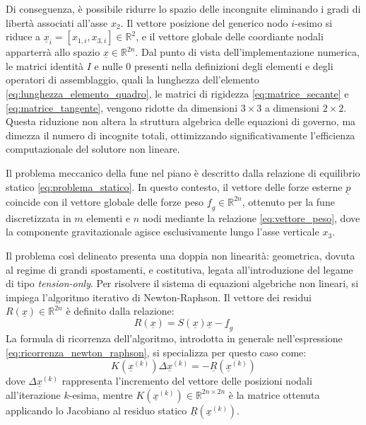 Di conseguenza, è possibile ridurre lo spazio delle incongnite eliminando i gradi di libertà associati all'asse $x_2$. Il vettore posizione del generico nodo $i$-esimo si riduce a $\underline{x}_i = [x_{1,i}, x_{3,i}] \in \mathbb{R}^{2}$, e il vettore globale delle coordiante nodali apparterrà allo spazio $\underline{x} \in \mathbb{R}^{2n}$.
Dal punto di vista dell'implementazione numerica, le matrici identità $I$ e nulle $0$ presenti nella definizioni degli elementi e degli operatori di assemblaggio, quali la lunghezza dell'elemento \eqref{eq:lunghezza_elemento_quadro}, le matrici di rigidezza \eqref{eq:matrice_secante} e \eqref{eq:matrice_tangente}, vengono ridotte da dimensioni $3 \times 3$ a dimensioni $2 \times 2$. Questa riduzione non altera la struttura algebrica delle equazioni di governo, ma dimezza il numero di incognite totali, ottimizzando significativamente l'efficienza computazionale del solutore non lineare.

\vspace{1em}
Il problema meccanico della fune nel piano è descritto dalla relazione di equilibrio statico \eqref{eq:problema_statico}. In questo contesto, il vettore delle forze esterne $\underline{p}$ coincide con il vettore globale delle forze peso $\underline{f}_{g} \in \mathbb{R}^{2n}$, ottenuto per la fune discretizzata in $m$ elementi e $n$ nodi mediante la relazione \eqref{eq:vettore_peso}, dove la componente gravitazionale agisce esclusivamente lungo l'asse verticale $x_3$.

Il problema così delineato presenta una doppia non linearità: geometrica, dovuta al regime di grandi spostamenti, e costitutiva, legata all'introduzione del legame di tipo \textit{tension-only}. Per risolvere il sistema di equazioni algebriche non lineari, si impiega l'algoritmo iterativo di Newton-Raphson. Il vettore dei residui $R(\underline{x}) \in \mathbb{R}^{2n}$ è definito dalla relazione: 
\begin{equation}
   R(\underline{x}) = S(\underline{x})\underline{x} - \underline{f}_{g}
   \label{eq:residuo_problema_statico}
\end{equation}
La formula di ricorrenza dell'algoritmo, introdotta in generale nell'espressione \eqref{eq:ricorrenza_newton_raphson}, si specializza per questo caso come:
\begin{equation}
   K(\underline{x}^{(k)}) \Delta\underline{x}^{(k)} = - \underline{R}(\underline{x}^{(k)})
\end{equation}
dove $\Delta \underline{x}^{(k)}$ rappresenta l'incremento del vettore delle posizioni nodali all'iterazione $k$-esima, mentre $K(\underline{x}^{(k)}) \in \mathbb{R}^{2n \times 2n}$ è la matrice ottenuta applicando lo Jacobiano al residuo statico $\underline{R}(\underline{x}^{(k)})$. 

